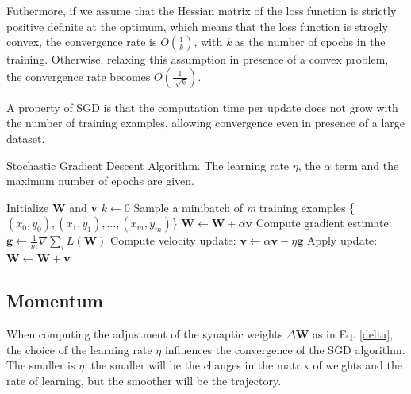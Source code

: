 		Futhermore, if we assume that the Hessian matrix of the loss function is strictly positive definite at the optimum, which means that the loss function is strogly convex, the convergence rate is $O(\frac{1}{k})$, with \textit{k} as the number of epochs in the training. %
		Otherwise, relaxing this assumption in presence of a convex problem, the convergence rate becomes $O(\frac{1}{\sqrt[]{k}})$\cite{Goodfellow-et-al-2016}.%

		A property of SGD is that the computation time per update does not grow with the number of training examples, allowing convergence even in presence of a large dataset.

		\begin{algorithm}[H]
			\caption{Stochastic Gradient Descent Algorithm. The learning rate $\eta$, the $\alpha$ term and the maximum number of epochs are given.}
			\label{alg:sgd}
			\begin{algorithmic}[1]
					\State Initialize \textbf{W} and \textbf{v}
					\State $k \gets 0$
						\State Sample a minibatch of \textit{m} training examples \{\textit{$(x_0,y_0),(x_1,y_1),...,(x_m,y_m)$}\}
							\State $\textbf{W} \gets \textbf{W} + \alpha \textbf{v}$
						\EndIf
						\State Compute gradient estimate: $\textbf{g} \gets \frac {1}{m} \nabla \sum_i\textit{L}(\textbf{W})$
						\State Compute velocity update: $\textbf{v} \gets \alpha \textbf{v} - \eta \textbf{g}$
						\State Apply update: $\textbf{W} \gets \textbf{W} + \textbf{v}$
					\EndWhile
				\EndProcedure
			\end{algorithmic}
		\end{algorithm}


		\subsection{Momentum}
		\label{sec:momentum}
			When computing the adjustment of the synaptic weights $\Delta\textbf{W}$ as in Eq. \ref{delta}, the choice of the learning rate $\eta$ influences the convergence of the SGD algorithm.
			The smaller is $\eta$, the smaller will be the changes in the matrix of weights and the rate of learning, but the smoother will be the trajectory.


